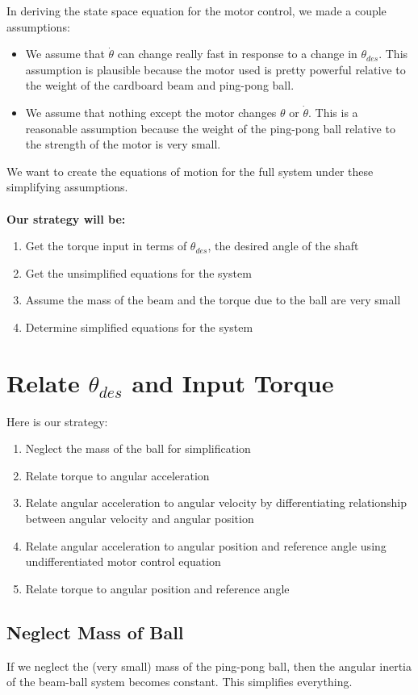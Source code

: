 \documentclass[a4paper]{article}
\begin{document}
In deriving the state space equation for the motor control, we made a couple assumptions:\begin{itemize}
\item We assume that $\dot{\theta}$ can change really fast in response to a change in $\theta_{des}$. This assumption is plausible because the motor used is pretty powerful relative to the weight of the cardboard beam and ping-pong ball.
\item We assume that nothing except the motor changes $\theta$ or $\dot{\theta}$. This is a reasonable assumption because the weight of the ping-pong ball relative to the strength of the motor is very small.
\end{itemize}
We want to create the equations of motion for the full system under these simplifying assumptions.
\\\\
\textbf{Our strategy will be:}
\begin{enumerate}
\item Get the torque input in terms of $\theta_{des}$, the desired angle of the shaft
\item Get the unsimplified equations for the system
\item Assume the mass of the beam and the torque due to the ball are very small
\item Determine simplified equations for the system
\end{enumerate}
\section*{Relate $\theta_{des}$ and Input Torque}
Here is our strategy:
\begin{enumerate}
\item Neglect the mass of the ball for simplification
\item Relate torque to angular acceleration
\item Relate angular acceleration to angular velocity by differentiating relationship between angular velocity and angular position
\item Relate angular acceleration to angular position and reference angle using undifferentiated motor control equation
\item Relate torque to angular position and reference angle
\end{enumerate}

\subsection*{Neglect Mass of Ball}
If we neglect the (very small) mass of the ping-pong ball, then the angular inertia of the beam-ball system becomes constant. This simplifies everything.
\end{document}
